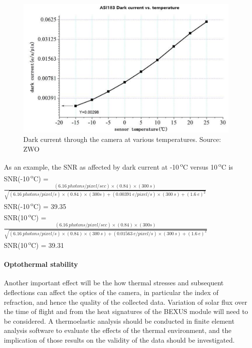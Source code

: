 	\begin{figure}[H]
    \centering
    \includegraphics[scale=0.8]{4-experiment-design/img/mechanical/darkcurrent.png}
    	\caption{Dark current through the camera at various temperatures. Source: ZWO}
	\label{fig:darkcurrent}
	\end{figure}

As an example, the SNR as affected by dark current at -10\,\textsuperscript{o}C versus 10\,\textsuperscript{o}C is\\

 SNR(-10\,\textsuperscript{o}C) =  $\frac{(\SI{6.16}{photons \per pixel \per sec})\times (0.84)\times (\SI{300}{s})}{\sqrt{(\SI{6.16}{photons \per pixel \per s})\times (0.84)\times (300s)+(\SI{0.00391}{e \per pixel \per s})\times (\SI{300}{s})+(\SI{1.6}{e})^2}}$ \\

 SNR(-10\,\textsuperscript{o}C) = 39.35\\

 SNR(10\,\textsuperscript{o}C) =  $\frac{(\SI{6.16}{photons \per pixel \per sec})\times (0.84)\times (300s)}{\sqrt{(\SI{6.16}{photons \per pixel \per s})\times (0.84)\times (\SI{300}{s})+(\SI{0.01563}{e \per pixel \per s})\times (\SI{300}{s})+(\SI{1.6}{e})^2}}$ \\

 SNR(10\,\textsuperscript{o}C) = 39.31\\


\paragraph{Optothermal stability}
Another important effect will be the how thermal stresses and subsequent deflections can affect the optics of the camera, in particular the index of refraction, and hence the quality of the collected data. Variation of solar flux over the time of flight and from the heat signatures of the BEXUS module will need to be considered. A thermoelastic analysis should be conducted in finite element analysis software to evaluate the effects of the thermal environment, and the implication of those results on the validity of the data should be investigated. \

